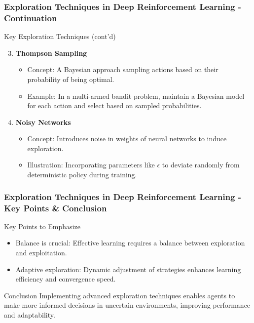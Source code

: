 \documentclass[aspectratio=169]{beamer}
\begin{document}
\begin{frame}[fragile]
    \frametitle{Exploration Techniques in Deep Reinforcement Learning - Continuation}
    \begin{block}{Key Exploration Techniques (cont'd)}
        \begin{enumerate}
            \setcounter{enumi}{2}
            \item \textbf{Thompson Sampling}
                \begin{itemize}
                    \item Concept: A Bayesian approach sampling actions based on their probability of being optimal.
                    \item Example: In a multi-armed bandit problem, maintain a Bayesian model for each action and select based on sampled probabilities.
                \end{itemize}
            \item \textbf{Noisy Networks}
                \begin{itemize}
                    \item Concept: Introduces noise in weights of neural networks to induce exploration.
                    \item Illustration: Incorporating parameters like $\epsilon$ to deviate randomly from deterministic policy during training.
                \end{itemize}
        \end{enumerate}
    \end{block}
\end{frame}

\begin{frame}[fragile]
    \frametitle{Exploration Techniques in Deep Reinforcement Learning - Key Points & Conclusion}
    \begin{block}{Key Points to Emphasize}
        \begin{itemize}
            \item Balance is crucial: Effective learning requires a balance between exploration and exploitation.
            \item Adaptive exploration: Dynamic adjustment of strategies enhances learning efficiency and convergence speed.
        \end{itemize}
    \end{block}

    \begin{block}{Conclusion}
        Implementing advanced exploration techniques enables agents to make more informed decisions in uncertain environments, improving performance and adaptability.
    \end{block}
\end{frame}
\end{document}
